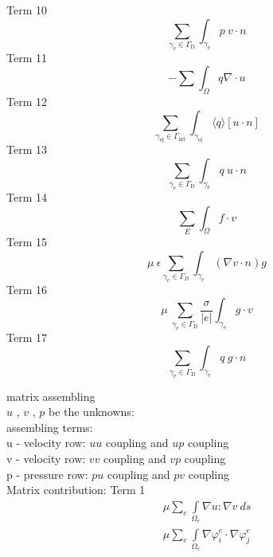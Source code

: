 \documentclass[11pt,a4paper]{article}
\begin{document}
Term 10
\begin{equation*}
 \sum\limits_{\gamma_{\text{e}} \in \Gamma_{\text{D}}} \int_{\gamma_{\text{e}}} p ~ v \cdot n
\end{equation*}
Term 11
\begin{equation*}
- \sum \int_\Omega q \nabla \cdot u 
 \end{equation*}
Term 12
\begin{equation*}
\sum\limits_{\gamma_{\text{ef}} \in \Gamma_{\text{int}}} \int_{\gamma_{\text{ef}}}
\langle q \rangle [u \cdot n]
\end{equation*}
Term 13
\begin{equation*}
\sum\limits_{\gamma_{\text{e}} \in \Gamma_{\text{D}}} \int_{\gamma_{\text{e}}} q ~ u \cdot n
\end{equation*}
Term 14
\begin{equation*}
\sum\limits_E \int_{\Omega} f \cdot v
\end{equation*}
Term 15
\begin{equation*}
\mu~{\epsilon}\sum\limits_{\gamma_{\text{e}} \in \Gamma_{D}}\int_{\gamma_{\text{e}}} (\nabla v \cdot n) g
\end{equation*}
Term 16
\begin{equation*}
\mu~{\sum\limits_{\gamma_{\text{e}} \in \Gamma_{\text{D}}} \frac{\sigma}{|{e}|}\int_{\gamma_{\text{e}}} g \cdot v}
\end{equation*}
Term 17
\begin{equation*}
\sum\limits_{\gamma_{\text{e}} \in \Gamma_{\text{D}}} \int_{\gamma_{\text{e}}} q ~ g \cdot n
\end{equation*}


\newpage
matrix assembling\\

 $u$ , $v$ , $p$ be the unknowns:\\

assembling terms:\\
u - velocity row: $u$$u$ coupling and $u$$p$ coupling\\
v - velocity row: $v$$v$ coupling and $v$$p$ coupling\\
p - pressure row: $p$$u$ coupling and $p$$v$ coupling\\

\newpage
Matrix contribution: Term 1\\
\begin{equation*}
\begin{aligned}
\mu \sum\limits_{e} \int\limits_{\Omega_e} \nabla u : \nabla v~ds\\
\mu \sum\limits_{e} \int\limits_{\Omega_e} \nabla \varphi^e_i \cdot \nabla \varphi^e_j\\ 
\end{aligned}
\end{equation*}
\end{document}
